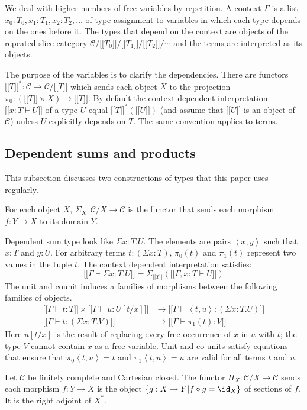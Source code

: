 \documentclass{tac}
\newcommand\cat\mathcal
\newcommand\set[1]{\left\{#1\right\}}
\newcommand\ri{^*}
\newcommand\of{:}
\newcommand\db[1]{{[\![}#1{]\!]}}
\newcommand\dsum{\Sigma_}
\newcommand\dprod{\Pi_}
\newcommand\tuplet[1]{\left\langle #1 \right\rangle}
\begin{document}
We deal with higher numbers of free variables by repetition. A context $\Gamma$ is a list $x_0\of T_0,x_1\of T_1,x_2\of T_2,\dots$ of type assignment to variables in which each type depends on the ones before it. The types that depend on the context are objects of the repeated slice category $\cat C/\db{T_0}/\db{T_1}/\db{T_2}/\dotsm$ and the terms are interpreted as its objects. 

The purpose of the variables is to clarify the dependencies. There are functors $\db T\ri\of\cat C\to \cat C/\db T$ which sends each object $X$ to the projection $\pi_0\of(\db T\times X)\to \db T$. By default the context dependent interpretation $\db{x\of T\vdash U}$ of a type $U$ equal $\db T\ri(\db U)$ (and assume that $\db U$ is an object of $\cat C$) unless $U$ explicitly depends on $T$. The same convention applies to terms.

\subsection{Dependent sums and products}
This subsection discusses two constructions of types that this paper uses regularly.


For each object $X$, $\dsum X\of\cat C/X\to \cat C$ is the functor that sends each morphism $f\of Y\to X$ to its domain $Y$.

Dependent sum type look like $\Sigma x\of T.U$. The elements are pairs $\tuplet{x,y}$ such that $x\of T$ and $y\of U$. For arbitrary terms $t\of(\Sigma x\of T)$, $\pi_0(t)$ and $\pi_1(t)$ represent two values in the tuple $t$. The context dependent interpretation satisfies:
\[ \db{\Gamma\vdash\Sigma x\of T.U} = \dsum {\db T}(\db{\Gamma,x\of T\vdash U}) \]
The unit and counit induces a families of morphisms between the following families of objects.
\begin{align*}
\db{\Gamma\vdash t\of T}\times\db{\Gamma\vdash u\of U[t/x]} &\to \db{\Gamma\vdash \tuplet{t, u}\of(\Sigma x\of T.U)}\\
\db{\Gamma\vdash t\of (\Sigma x\of T.V)}&\to \db{\Gamma\vdash \pi_1(t) \of V}
\end{align*}
Here $u[t/x]$ is the result of replacing every free occurrence of $x$ in $u$ with $t$; the type $V$ cannot contain $x$ as a free variable. Unit and co-units satisfy equations that ensure that $\pi_0\tuplet{t,u}=t$ and $\pi_1\tuplet{t,u}=u$ are valid for all terms $t$ and $u$.


Let $\cat C$ be finitely complete and Cartesian closed. The functor $\dprod X\of\cat C/X\to \cat C$ sends each morphism $f\of Y\to X$ is the object $\set{g\of X\to Y| f\circ g = \id_X }$ of sections of $f$. It is the right adjoint of $X\ri$.
\end{document}
